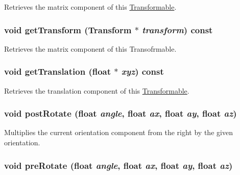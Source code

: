 Retrieves the matrix component of this \hyperlink{classm3g_1_1Transformable}{Transformable}. \hypertarget{classm3g_1_1Transformable_73f387f99c527b382c8aaa54b8af6ed6}{
\subsubsection[{getTransform}]{\setlength{\rightskip}{0pt plus 5cm}void getTransform ({\bf Transform} $\ast$ {\em transform}) const}}
\label{classm3g_1_1Transformable_73f387f99c527b382c8aaa54b8af6ed6}


Retrieves the matrix component of this Transofrmable. \hypertarget{classm3g_1_1Transformable_d8aec42959fecc3d76f9539d3afa3c8d}{
\subsubsection[{getTranslation}]{\setlength{\rightskip}{0pt plus 5cm}void getTranslation (float $\ast$ {\em xyz}) const}}
\label{classm3g_1_1Transformable_d8aec42959fecc3d76f9539d3afa3c8d}


Retrieves the translation component of this \hyperlink{classm3g_1_1Transformable}{Transformable}. \hypertarget{classm3g_1_1Transformable_4abf135257f132cdf9580f3a3e11ea6c}{
\subsubsection[{postRotate}]{\setlength{\rightskip}{0pt plus 5cm}void postRotate (float {\em angle}, \/  float {\em ax}, \/  float {\em ay}, \/  float {\em az})}}
\label{classm3g_1_1Transformable_4abf135257f132cdf9580f3a3e11ea6c}


Multiplies the current orientation component from the right by the given orientation. \hypertarget{classm3g_1_1Transformable_718b606184672eec83263ad44d5c7431}{
\subsubsection[{preRotate}]{\setlength{\rightskip}{0pt plus 5cm}void preRotate (float {\em angle}, \/  float {\em ax}, \/  float {\em ay}, \/  float {\em az})}}
\label{classm3g_1_1Transformable_718b606184672eec83263ad44d5c7431}


